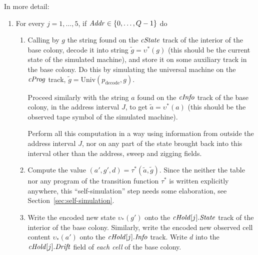 \documentclass[12pt]{memoir}
\newcommand{\fld}[1]{\ensuremath{\textit{#1\/}}}
\newcommand{\Addr}{\fld{Addr}}
\newcommand{\cAddr}{\fld{cAddr}}
\newcommand{\Drift}{\fld{Drift}}
\newcommand{\cHold}{\fld{cHold}}
\newcommand{\Info}{\fld{Info}}
\newcommand{\cInfo}{\fld{cInfo}}
\newcommand{\cKind}{\fld{cKind}}
\newcommand{\cProg}{\fld{cProg}}
\newcommand{\State}{\fld{State}}
\newcommand{\cState}{\fld{cState}}
\newcommand{\decode}{\mathrm{decode}}
\newcommand{\Member}{\mathrm{Member}}
\newcommand{\Un}{\mathrm{Univ}}
\begin{document}
In more detail:
\begin{enumerate}

      \item For every \( j=1,\dots,5 \), if \( \Addr \in \set{0, \dots, Q-1} \) do

       \begin{enumerate}

          \item Calling by \( g \) the  string found on the \( \cState \) track of
            the interior of the base colony,
            decode it into string \( \tilde g=\upsilon^{*}(g) \)
            (this should be the current state of the simulated machine), and
            store it on some auxiliary track in the base colony.
            Do this by simulating the universal machine on the \( \cProg \) track,
            \( \tilde g = \Un(p_{\decode}, g) \).

            Proceed similarly with the string \( a \) found on the \( \cInfo \)
            track of the base colony, in the address interval \( J \), 
            to get \( \tilde a = \upsilon^{*}(a) \)
            (this should be the observed tape symbol of the simulated machine).

            Perform all this computation in a way using information from outside
            the address interval \( J \), nor on any 
            part of the state brought back into this interval other than the address,
            sweep and zigging fields.

          \item \label{i:comp.trans}
           Compute the value \( (a',g',d)=\tau^{*}(\tilde a, \tilde g) \).
Since the neither the table nor any program of the transition 
function \( \tau^{*} \) is written explicitly anywhere, this ``self-simulation'' step needs
some elaboration, see Section~\ref{sec:self-simulation}.

            \item\label{i:comp.write}
              Write the encoded new state \( \upsilon_{*}(g') \) onto the
              \( \cHold[j].\State \) track of the interior of the base colony.
              Similarly, write the encoded new observed cell
              content \( \upsilon_{*}(a') \) onto the \( \cHold[j].\Info \) track.
              Write \( d \) into the \( \cHold[j].\Drift \) field of \emph{each cell} of
              the base colony.


\end{enumerate}
\end{enumerate}
\end{document}
